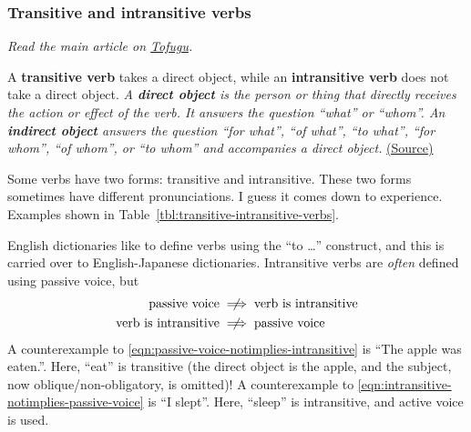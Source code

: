 \documentclass[../nihongo-gakushuu-kyouzai.tex]{subfiles}
\begin{document}



\subsubsection{Transitive and intransitive verbs} \label{sec:transitive-intransitive-verbs}
\emph{Read the main article on \href{https://www.tofugu.com/japanese/transitive-intransitive-verbs/}{Tofugu}.}

A \textbf{transitive verb} takes a direct object, while an \textbf{intransitive verb} does not take a direct object. \emph{A \textbf{direct object} is the person or thing that directly receives the action or effect of the verb. It answers the question ``what'' or ``whom''.  An \textbf{indirect object} answers the question ``for what'', ``of what'', ``to what'', ``for whom'', ``of whom'', or ``to whom'' and accompanies a direct object.} \href{https://www.britannica.com/dictionary/eb/qa/Direct-and-Indirect-Objects}{(Source)}

Some verbs have two forms: transitive and intransitive. These two forms sometimes have different pronunciations. I guess it comes down to experience. Examples shown in Table~\ref{tbl:transitive-intransitive-verbs}.


 English dictionaries like to define verbs using the ``to \dots'' construct, and this is carried over to English-Japanese dictionaries. Intransitive verbs are \emph{often} defined using passive voice, but
\begin{align}
    \text{passive voice}&\centernot\implies\text{verb is intransitive} \label{eqn:passive-voice-notimplies-intransitive} \\
    \text{verb is intransitive}&\centernot\implies\text{passive voice} \label{eqn:intransitive-notimplies-passive-voice}
\end{align}
A counterexample to \eqref{eqn:passive-voice-notimplies-intransitive} is ``The apple was eaten.''. Here, ``eat'' is transitive (the direct object is the apple, and the subject, now oblique/non-obligatory, is omitted)! A counterexample to \eqref{eqn:intransitive-notimplies-passive-voice} is ``I slept''. Here, ``sleep'' is intransitive, and active voice is used.
\end{document}

